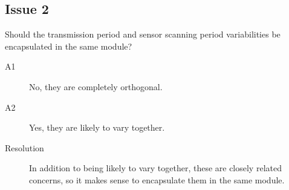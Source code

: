 \documentclass[letterpaper,11pt]{article}
\begin{document}
\subsection{Issue 2}
Should the transmission period and sensor scanning period variabilities be encapsulated in the same module?
\begin{description}
\item[A1] No, they are completely orthogonal.
\item[A2] Yes, they are likely to vary together.
\item[Resolution] In addition to being likely to vary together, these are closely related concerns, so it makes sense to encapsulate them in the same module.
\end{description}


\listoftodos
\end{document}
